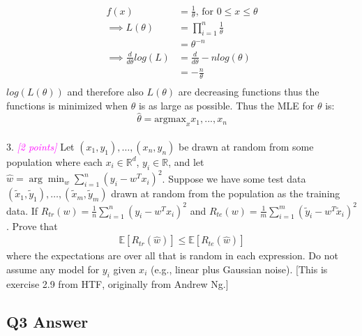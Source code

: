 \documentclass{article}
\newcommand{\1}{\mathbf{1}}
\def\E{\mathbb{E}}
\def\R{\mathbb{R}}
\newcommand{\grade}[1]{\small\textcolor{magenta}{\emph{[#1 points]}} \normalsize}
\begin{document}
\begin{align}
    f(x) & = \frac{1}{\theta} \text{, for } 0 \le x \le \theta \\
    \implies L(\theta) & = \prod_{i=1}^n \frac{1}{\theta} \\
    & = \theta^{-n} \\
    \implies \frac{d}{d\theta} log(L) & = \frac{d}{d\theta} -n log(\theta) \\
    & = -\frac{n}{\theta} \\
\end{align}
$log(L(\theta))$ and therefore also $L(\theta)$ are decreasing functions thus the functions is minimized when $\theta$ is as large as possible. Thus the MLE for $\theta$ is:
$$\widehat{\theta} = \text{argmax}_x x_1,...,x_n $$ \\



3. \grade{2} Let $(x_1,y_1),\dots,(x_n,y_n)$ be drawn at random from some population where each $x_i \in \R^d$, $y_i \in \R$, and let $\widehat{w} = \arg\min_w \sum_{i=1}^n (y_i - w^T x_i)^2$.
Suppose we have some test data $(\widetilde{x}_1,\widetilde{y}_1),\dots,(\widetilde{x}_m,\widetilde{y}_m)$ drawn at random from the population as the training data. 
If $R_{tr}(w) = \frac{1}{n} \sum_{i=1}^n (y_i - w^T x_i)^2$ and $R_{te}(w) = \frac{1}{m} \sum_{i=1}^m (\widetilde{y}_i - w^T \widetilde{x}_i)^2$. Prove that 
\begin{align*}
\E[ R_{tr}(\widehat{w}) ] \leq \E[ R_{te}(\widehat{w}) ]
\end{align*}
where the expectations are over all that is random in each expression. Do not assume any model for $y_i$ given $x_i$ (e.g., linear plus Gaussian noise). [This is exercise 2.9 from HTF, originally from Andrew Ng.]\\


\subsection{Q3 Answer}
\end{document}
